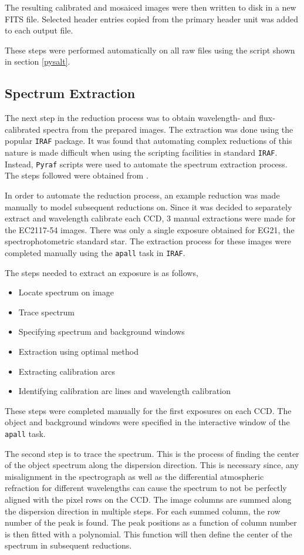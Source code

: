 The resulting calibrated and mosaiced images were then written to disk in a new FITS file. Selected header entries copied from the primary header unit was added to each output file.

These steps were performed automatically on all raw files using the script shown in section \ref{pysalt}.


\subsection{Spectrum Extraction}
\label{specextract}

The next step in the reduction process was to obtain wavelength- and flux-calibrated spectra from the prepared images. The extraction was done using the popular \texttt{IRAF} package. It was found that automating complex reductions of this nature is made difficult when using the scripting facilities in standard \texttt{IRAF}. Instead, \texttt{Pyraf} scripts were used to automate the spectrum extraction process. The steps followed were obtained from \cite{slitspecIRAF}.

In order to automate the reduction process, an example reduction was made manually to model subsequent reductions on. Since it was decided to separately extract and wavelength calibrate each CCD, 3 manual extractions were made for the EC2117-54 images. There was only a single exposure obtained for EG21, the spectrophotometric standard star. The extraction process for these images were completed manually using the \texttt{apall} task in \texttt{IRAF}.

The steps needed to extract an exposure is as follows,

\begin{itemize}
 \item Locate spectrum on image
 \item Trace spectrum
 \item Specifying spectrum and background windows
 \item Extraction using optimal method
 \item Extracting calibration arcs
 \item Identifying calibration arc lines and wavelength calibration
\end{itemize}

These steps were completed manually for the first exposures on each CCD. The object and background windows were specified in the interactive window of the \texttt{apall} task.

The second step is to trace the spectrum. This is the process of finding the center of the object spectrum along the dispersion direction. This is necessary since, any misalignment in the spectrograph as well as the differential atmospheric refraction for different wavelengths can cause the spectrum to not be perfectly aligned with the pixel rows on the CCD. The image columns are summed along the dispersion direction in multiple steps. For each summed column, the row number of the peak is found. The peak positions as a function of column number is then fitted with a polynomial. This function will then define the center of the spectrum in subsequent reductions.

